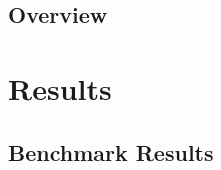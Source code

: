 \subsection{Overview} \label{sec4:analysis_overview}

\section{Results} \label{sec4:results}
\subsection{Benchmark Results} \label{sec4:benchmark_results}

